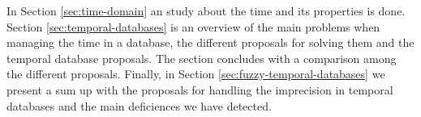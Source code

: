 %
%




In Section \ref{sec:time-domain} an study about the time and its properties is done. Section \ref{sec:temporal-databases} is an overview of the main problems when managing the time in a database, the different proposals for solving them and the temporal database proposals. The section concludes with a comparison among the different proposals. Finally, in Section \ref{sec:fuzzy-temporal-databases} we present a sum up with the proposals for handling the imprecision in temporal databases and the main deficiences we have detected.
